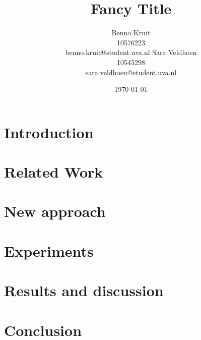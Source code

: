 \documentclass[11pt]{article}
\title{Fancy Title}
\author{Benno Kruit\\10576223\\benno.kruit@student.uva.nl\And
Sara Veldhoen\\10545298\\sara.veldhoen@student.uva.nl}
\date{\today}
\begin{document}
\maketitle


\section{Introduction}\label{s:introduction}

\section{Related Work}\label{s:relatedWork}

\section{New approach}\label{s:newApproach}

\section{Experiments}\label{s:experiments}

\section{Results and discussion}\label{s:results}

\section{Conclusion}\label{s:conclusion}




\end{document}
